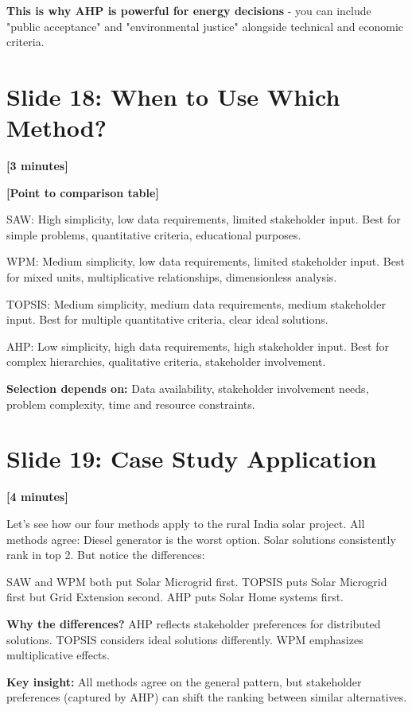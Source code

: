 \documentclass[12pt]{article}
\begin{document}
\textcolor{emphasis}{\textbf{This is why AHP is powerful for energy decisions}} - you can include "public acceptance" and "environmental justice" alongside technical and economic criteria.

\section*{Slide 18: When to Use Which Method?}
\textcolor{timing}{\textbf{[3 minutes]}}

\textcolor{speakernote}{\textbf{[Point to comparison table]}}

SAW: High simplicity, low data requirements, limited stakeholder input. Best for simple problems, quantitative criteria, educational purposes.

WPM: Medium simplicity, low data requirements, limited stakeholder input. Best for mixed units, multiplicative relationships, dimensionless analysis.

TOPSIS: Medium simplicity, medium data requirements, medium stakeholder input. Best for multiple quantitative criteria, clear ideal solutions.

AHP: Low simplicity, high data requirements, high stakeholder input. Best for complex hierarchies, qualitative criteria, stakeholder involvement.

\textcolor{emphasis}{\textbf{Selection depends on:}} Data availability, stakeholder involvement needs, problem complexity, time and resource constraints.

\section*{Slide 19: Case Study Application}
\textcolor{timing}{\textbf{[4 minutes]}}

Let's see how our four methods apply to the rural India solar project. All methods agree: Diesel generator is the worst option. Solar solutions consistently rank in top 2. But notice the differences:

SAW and WPM both put Solar Microgrid first. TOPSIS puts Solar Microgrid first but Grid Extension second. AHP puts Solar Home systems first.

\textcolor{emphasis}{\textbf{Why the differences?}} AHP reflects stakeholder preferences for distributed solutions. TOPSIS considers ideal solutions differently. WPM emphasizes multiplicative effects.

\textcolor{emphasis}{\textbf{Key insight:}} All methods agree on the general pattern, but stakeholder preferences (captured by AHP) can shift the ranking between similar alternatives.
\end{document}
